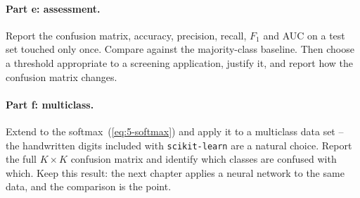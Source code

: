 \paragraph{Part e: assessment.}
Report the confusion matrix, accuracy, precision, recall, $F_1$ and AUC on a
test set touched only once.  Compare against the majority-class baseline.
Then choose a threshold appropriate to a screening application, justify it,
and report how the confusion matrix changes.

\paragraph{Part f: multiclass.}
Extend to the softmax~(\ref{eq:5-softmax}) and apply it to a multiclass data
set -- the handwritten digits included with \texttt{scikit-learn} are a
natural choice.  Report the full $K\times K$ confusion matrix and identify
which classes are confused with which.  Keep this result: the next chapter
applies a neural network to the same data, and the comparison is the point.
